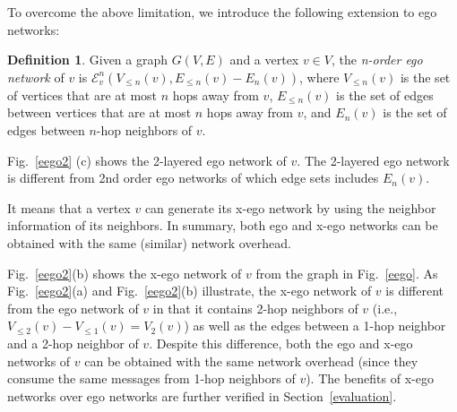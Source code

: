 \documentclass[preprint,12pt,authoryear]{elsarticle}
\newcommand{\V}[2]{V_{#2}({#1})}
\newcommand{\LV}[2]{V_{\le #2}({#1})}
\newcommand{\E}[2]{E_{#2}({#1})}
\newcommand{\LE}[2]{E_{\le #2}({#1})}
\newcommand{\ENN}[2]{\mathcal{E}_{{#1}}^{{#2}}}
\theoremstyle{definition}
\newtheorem{definition}{Definition}[section]
\begin{document}
To overcome the above limitation, we introduce the following extension to ego networks:

\begin{definition}\label{def:multi-order-network}
Given a graph $G(V, E)$ and a vertex $v \in V$, the \emph{n-order ego network} of $v$ is $\ENN{v}{n}(\LV{v}{n}, \LE{v}{n} - \E{v}{n})$, where $\LV{v}{n}$ is the set of vertices that are at most $n$ hops away from $v$, $\LE{v}{n}$ is the set of edges between vertices that are at most $n$ hops away from $v$, and $\E{v}{n}$ is the set of edges between $n$-hop neighbors of $v$.
\end{definition}

Fig.~\ref{eego2} (c) shows the 2-layered ego network of $v$. The 2-layered ego network is different from 2nd order ego networks of which edge sets includes $\E{v}{n}$. 

It means that a vertex $v$ can generate its x-ego network by using the neighbor information of its neighbors. In summary, both ego and x-ego networks can be obtained with the same (similar) network overhead.

Fig.~\ref{eego2}(b) shows the x-ego network of $v$ from the graph in Fig.~\ref{eego}.
As Fig.~\ref{eego2}(a) and Fig.~\ref{eego2}(b) illustrate, the x-ego network of $v$ is different from the ego network of $v$ in that it contains 2-hop neighbors of $v$ (i.e., $\LV{v}{2} - \LV{v}{1} = \V{v}{2}$) as well as the edges between a 1-hop neighbor and a 2-hop neighbor of $v$.
Despite this difference, both the ego and x-ego networks of $v$ can be obtained with the same network overhead (since they consume the same messages from 1-hop neighbors of $v$).
The benefits of x-ego networks over ego networks are further verified in Section~\ref{evaluation}.

\end{document}

